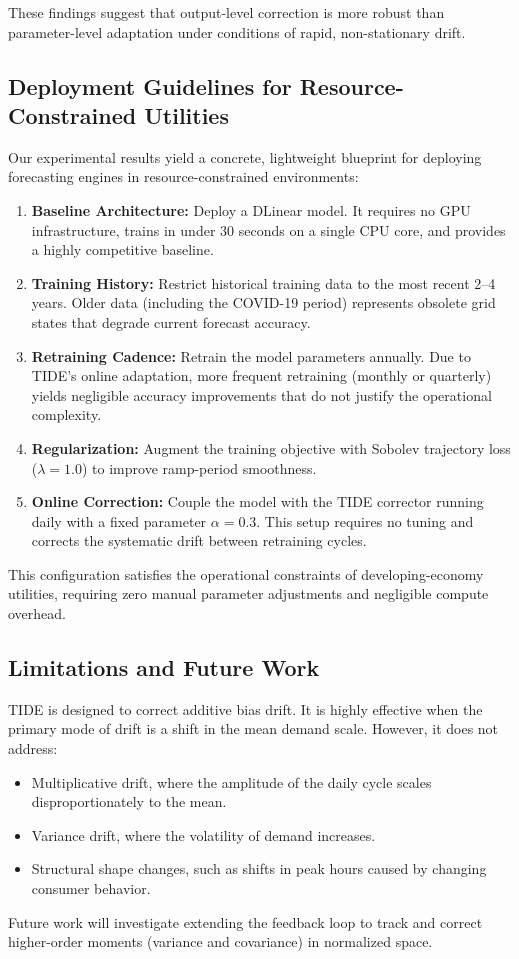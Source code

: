 \documentclass[10pt,twocolumn,letterpaper]{article}
\begin{document}
These findings suggest that output-level correction is more robust than parameter-level adaptation under conditions of rapid, non-stationary drift.

\subsection{Deployment Guidelines for Resource-Constrained Utilities}
Our experimental results yield a concrete, lightweight blueprint for deploying forecasting engines in resource-constrained environments:
\begin{enumerate}
    \item \textbf{Baseline Architecture:} Deploy a DLinear model. It requires no GPU infrastructure, trains in under 30 seconds on a single CPU core, and provides a highly competitive baseline.
    \item \textbf{Training History:} Restrict historical training data to the most recent 2--4 years. Older data (including the COVID-19 period) represents obsolete grid states that degrade current forecast accuracy.
    \item \textbf{Retraining Cadence:} Retrain the model parameters annually. Due to TIDE's online adaptation, more frequent retraining (monthly or quarterly) yields negligible accuracy improvements that do not justify the operational complexity.
    \item \textbf{Regularization:} Augment the training objective with Sobolev trajectory loss ($\lambda = 1.0$) to improve ramp-period smoothness.
    \item \textbf{Online Correction:} Couple the model with the TIDE corrector running daily with a fixed parameter $\alpha = 0.3$. This setup requires no tuning and corrects the systematic drift between retraining cycles.
\end{enumerate}

This configuration satisfies the operational constraints of developing-economy utilities, requiring zero manual parameter adjustments and negligible compute overhead.

\subsection{Limitations and Future Work}
TIDE is designed to correct additive bias drift. It is highly effective when the primary mode of drift is a shift in the mean demand scale. However, it does not address:
\begin{itemize}
    \item Multiplicative drift, where the amplitude of the daily cycle scales disproportionately to the mean.
    \item Variance drift, where the volatility of demand increases.
    \item Structural shape changes, such as shifts in peak hours caused by changing consumer behavior.
\end{itemize}
Future work will investigate extending the feedback loop to track and correct higher-order moments (variance and covariance) in normalized space.
\end{document}
